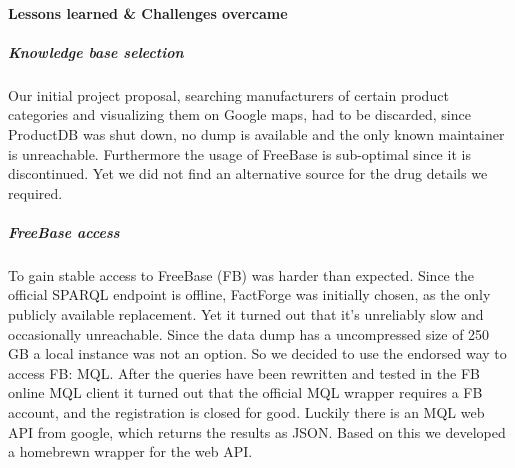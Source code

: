 \documentclass[11pt,titlepage,oneside,openany]{book}
\begin{document}
\paragraph{Lessons learned \& Challenges overcame}
\label{cha:lessons}

\label{challenges}

\subparagraph{Knowledge base selection} Our initial project proposal, searching manufacturers of certain product categories and visualizing them on Google maps, had to be discarded, since ProductDB was shut down, no dump is available and the only known maintainer is unreachable. Furthermore the usage of FreeBase is sub-optimal since it is discontinued. Yet we did not find an alternative source for the drug details we required. 


\subparagraph{FreeBase access}
\label{challenges:fb}
To gain stable access to FreeBase (FB) was harder than expected. Since the official SPARQL endpoint is offline, FactForge was initially chosen, as the only publicly available replacement. Yet it turned out that it's unreliably slow and occasionally unreachable. Since the data dump has a uncompressed size of 250 GB a local instance was not an option. 
So we decided to use the endorsed way to access FB: MQL. After the queries have been rewritten and tested in the FB online MQL client it turned out that the official MQL wrapper requires a FB account, and the registration is closed for good.
Luckily there is an MQL web API from google, which returns the results as JSON. Based on this we developed a homebrewn wrapper for the web API.



\appendix

\newpage
\end{document}
